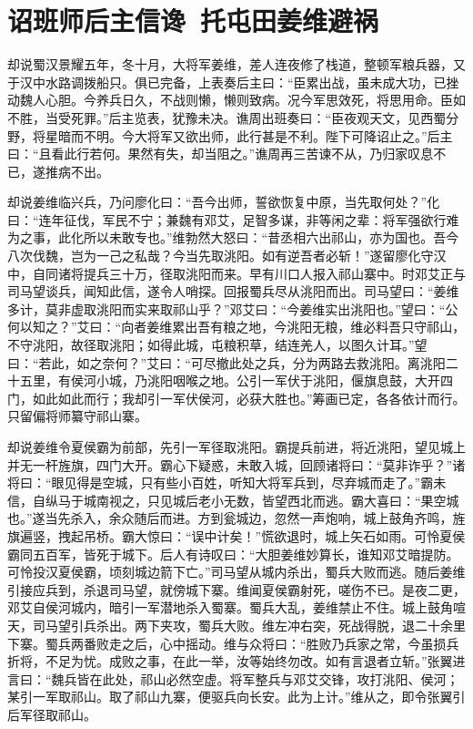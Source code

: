 \chapter{诏班师后主信谗~托屯田姜维避祸}

却说蜀汉景耀五年，冬十月，大将军姜维，差人连夜修了栈道，整顿军粮兵器，又于汉中水路调拨船只。俱已完备，上表奏后主曰：“臣累出战，虽未成大功，已挫动魏人心胆。今养兵日久，不战则懒，懒则致病。况今军思效死，将思用命。臣如不胜，当受死罪。”后主览表，犹豫未决。谯周出班奏曰：“臣夜观天文，见西蜀分野，将星暗而不明。今大将军又欲出师，此行甚是不利。陛下可降诏止之。”后主曰：“且看此行若何。果然有失，却当阻之。”谯周再三苦谏不从，乃归家叹息不已，遂推病不出。

却说姜维临兴兵，乃问廖化曰：“吾今出师，誓欲恢复中原，当先取何处？”化曰：“连年征伐，军民不宁；兼魏有邓艾，足智多谋，非等闲之辈：将军强欲行难为之事，此化所以未敢专也。”维勃然大怒曰：“昔丞相六出祁山，亦为国也。吾今八次伐魏，岂为一己之私哉？今当先取洮阳。如有逆吾者必斩！”遂留廖化守汉中，自同诸将提兵三十万，径取洮阳而来。早有川口人报入祁山寨中。时邓艾正与司马望谈兵，闻知此信，遂令人哨探。回报蜀兵尽从洮阳而出。司马望曰：“姜维多计，莫非虚取洮阳而实来取祁山乎？”邓艾曰：“今姜维实出洮阳也。”望曰：“公何以知之？”艾曰：“向者姜维累出吾有粮之地，今洮阳无粮，维必料吾只守祁山，不守洮阳，故径取洮阳；如得此城，屯粮积草，结连羌人，以图久计耳。”望曰：“若此，如之奈何？”艾曰：“可尽撤此处之兵，分为两路去救洮阳。离洮阳二十五里，有侯河小城，乃洮阳咽喉之地。公引一军伏于洮阳，偃旗息鼓，大开四门，如此如此而行；我却引一军伏侯河，必获大胜也。”筹画已定，各各依计而行。只留偏将师纂守祁山寨。

却说姜维令夏侯霸为前部，先引一军径取洮阳。霸提兵前进，将近洮阳，望见城上并无一杆旌旗，四门大开。霸心下疑惑，未敢入城，回顾诸将曰：“莫非诈乎？”诸将曰：“眼见得是空城，只有些小百姓，听知大将军兵到，尽弃城而走了。”霸未信，自纵马于城南视之，只见城后老小无数，皆望西北而逃。霸大喜曰：“果空城也。”遂当先杀入，余众随后而进。方到瓮城边，忽然一声炮响，城上鼓角齐鸣，旌旗遍竖，拽起吊桥。霸大惊曰：“误中计矣！”慌欲退时，城上矢石如雨。可怜夏侯霸同五百军，皆死于城下。后人有诗叹曰：“大胆姜维妙算长，谁知邓艾暗提防。可怜投汉夏侯霸，顷刻城边箭下亡。”司马望从城内杀出，蜀兵大败而逃。随后姜维引接应兵到，杀退司马望，就傍城下寨。维闻夏侯霸射死，嗟伤不已。是夜二更，邓艾自侯河城内，暗引一军潜地杀入蜀寨。蜀兵大乱，姜维禁止不住。城上鼓角喧天，司马望引兵杀出。两下夹攻，蜀兵大败。维左冲右突，死战得脱，退二十余里下寨。蜀兵两番败走之后，心中摇动。维与众将曰：“胜败乃兵家之常，今虽损兵折将，不足为忧。成败之事，在此一举，汝等始终勿改。如有言退者立斩。”张翼进言曰：“魏兵皆在此处，祁山必然空虚。将军整兵与邓艾交锋，攻打洮阳、侯河；某引一军取祁山。取了祁山九寨，便驱兵向长安。此为上计。”维从之，即令张翼引后军径取祁山。

